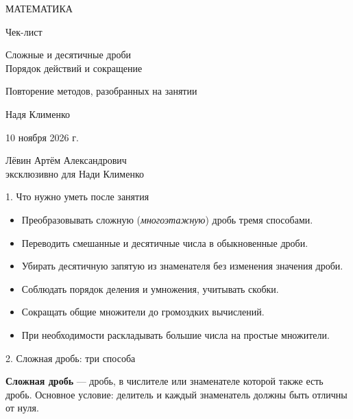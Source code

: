 \documentclass[a4paper,12pt]{article}
\newcommand{\sectionhead}[1]{%
  \needspace{4\baselineskip}
  \vspace{0.9\baselineskip}
  {\large\color{darkaccent}#1\par}
  \vspace{2pt}{\color{accent}\hrule height .5pt}\vspace{6pt}
}
\newcommand{\checkitem}[1]{\item[$\square$] #1}
\begin{document}
\thispagestyle{empty}
\begin{center}
\vspace*{28mm}
{\large\color{darkaccent} МАТЕМАТИКА}\par
\vspace{22mm}
{\LARGE Чек-лист}\par
\vspace{15mm}
{\LARGE\color{accent} Сложные и десятичные дроби}\\[4pt]
{\LARGE\color{accent} Порядок действий и сокращение}\par
\vspace{17mm}
{\normalsize Повторение методов, разобранных на занятии}\par
\vspace{29mm}
{\large Надя Клименко}\par
\vspace{13mm}
{\normalsize 10 ноября 2026 г.}\par
\vspace{22mm}
{\small Лёвин Артём Александрович}\\[2pt]
{\small эксклюзивно для Нади Клименко}\par
\vfill
{}
\vspace{6mm}
\end{center}
\clearpage

\sectionhead{1. Что нужно уметь после занятия}
\begin{itemize}[label={},leftmargin=0mm,itemsep=3pt]
\checkitem{Преобразовывать сложную (\textit{многоэтажную}) дробь тремя способами.}
\checkitem{Переводить смешанные и десятичные числа в обыкновенные дроби.}
\checkitem{Убирать десятичную запятую из знаменателя без изменения значения дроби.}
\checkitem{Соблюдать порядок деления и умножения, учитывать скобки.}
\checkitem{Сокращать общие множители до громоздких вычислений.}
\checkitem{При необходимости раскладывать большие числа на простые множители.}
\end{itemize}

\sectionhead{2. Сложная дробь: три способа}
\textbf{Сложная дробь} --- дробь, в числителе или знаменателе которой также есть дробь. Основное условие: делитель и каждый знаменатель должны быть отличны от нуля.
\end{document}
